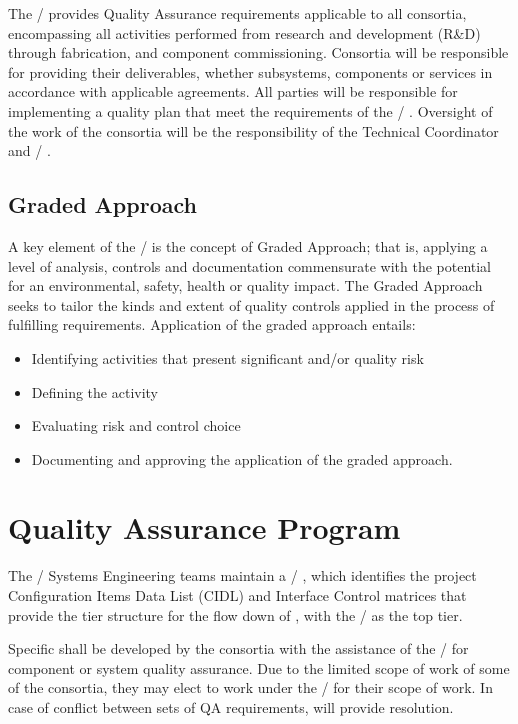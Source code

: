 The /  provides Quality Assurance requirements
applicable to all consortia, encompassing all activities performed
from research and development (R\&D) through fabrication, and component
commissioning. Consortia will be responsible for providing their
deliverables, whether subsystems, components or services in accordance
with applicable agreements. All parties will be responsible for
implementing a quality plan that meet the requirements of the
/ . Oversight of the work of the consortia will be
the responsibility of the  Technical Coordinator and / .

\subsection{Graded Approach}

A key element of the /  is the concept of Graded
Approach; that is, applying a level of analysis, controls and
documentation commensurate with the potential for an environmental,
safety, health or quality impact. The Graded Approach seeks to tailor
the kinds and extent of quality controls applied in the process of
fulfilling requirements. Application of the graded approach entails:
\begin{itemize}
 \item Identifying activities that present significant  and/or quality risk
 \item Defining the activity
 \item Evaluating risk and control choice
 \item Documenting and approving the application of the graded approach.
\end{itemize}

\section{Quality Assurance Program}

The / Systems Engineering teams maintain a /
, which identifies the project
Configuration Items Data List (CIDL) and Interface Control matrices
that provide the tier structure for the flow down of , with
the /  as the top tier.

Specific  shall be developed by the consortia with the
assistance of the /  for
component or system quality assurance. Due to the limited scope of
work of some of the consortia, they may elect to work under the
/  for their scope of work. In case of conflict between
sets of QA requirements,   will provide
resolution.

